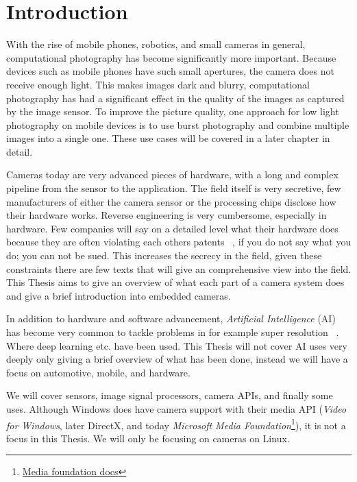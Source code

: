 \chapter{Introduction\label{intro}}
With the rise of mobile phones, robotics, and small cameras in general,
computational photography has become significantly more important. Because
devices such as mobile phones have such small apertures, the camera does not
receive enough light. This makes images dark and blurry, computational
photography has had a significant effect in the quality of the images as
captured by the image sensor. To improve the picture quality, one approach for
low light photography on mobile devices is to use burst photography and combine
multiple images into a single one\cite{burstPhotMobile}. These use cases will
be covered in a later chapter in detail.

Cameras today are very advanced pieces of hardware, with a long and complex
pipeline from the sensor to the application. The field itself is very
secretive, few manufacturers of either the camera sensor or the processing
chips disclose how their hardware works. Reverse engineering is very
cumbersome, especially in hardware. Few companies will say on a detailed level
what their hardware does because they are often violating each others patents~
\cite{experimentalCompPhot}, if you do not say what you do; you can not be
sued. This increases the secrecy in the field, given these constraints there
are few texts that will give an comprehensive view into the field. This Thesis
aims to give an overview of what each part of a camera system does and give a
brief introduction into embedded cameras.

In addition to hardware and software advancement, \textit{Artificial Intelligence} (AI)
has become very common to tackle problems in for example super resolution~
\cite{yangDeepLearningSingle2019, delbracio2021mobile}. Where deep
learning etc. have been used. This Thesis will not cover AI uses very deeply
only giving a brief overview of what has been done, instead we will have a
focus on automotive, mobile, and hardware.

We will cover sensors, image signal processors, camera APIs, and finally some
uses. Although Windows does have camera support with their media API
(\textit{Video for Windows}, later DirectX, and today \textit{Microsoft Media
Foundation}\footnote{\href{https://learn.microsoft.com/en-us/windows/win32/medfound/microsoft-media-foundation-sdk}{Media
foundation docs}}), it is not a focus in this Thesis. We will only be focusing
on cameras on Linux.
